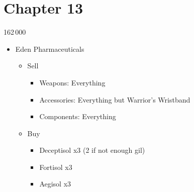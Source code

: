 \chapter{Chapter 13}

	\begin{shop}{162\,000}
		\begin{itemize}
			\item Eden Pharmaceuticals
			      \begin{itemize}
				      \item Sell
				            \begin{itemize}
					            \item Weapons: Everything
					            \item Accessories: Everything but Warrior's Wristband
					            \item Components: Everything
				            \end{itemize}
				      \item Buy
				            \begin{itemize}
					            \item Deceptisol x3 (2 if not enough gil)
					            \item Fortisol x3
					            \item Aegisol x3
				            \end{itemize}
			      \end{itemize}
		\end{itemize}
	\end{shop}

